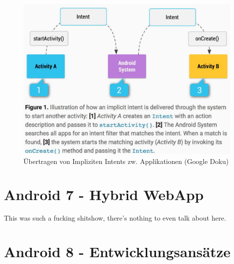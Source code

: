 \documentclass[a4paper]{article}
\begin{document}
	\begin{figure}[!htb]
		\centering
		\includegraphics[width=.65\textwidth]{img/android6/intents_implizit.jpg}
		\caption{Übertragen von Impliziten Intents zw. Applikationen (Google Doku)}
		\label{fig:implicit_intents}
	\end{figure}
	
	
	
\newpage
\section{Android 7 - Hybrid WebApp}

This was such a fucking shitshow, there's nothing to even talk about here.

\section{Android 8 - Entwicklungsansätze}

\end{document}
